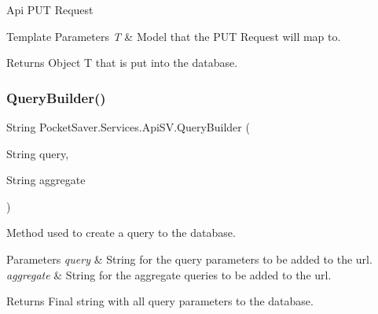 Api P\+UT Request 


\begin{DoxyTemplParams}{Template Parameters}
{\em T} & Model that the P\+UT Request will map to.\\
\hline
\end{DoxyTemplParams}
\begin{DoxyReturn}{Returns}
Object T that is put into the database.
\end{DoxyReturn}
\mbox{\label{class_pocket_saver_1_1_services_1_1_api_s_v_aa5064fcb4a18768820f20c39d75d4d44}} 
\subsubsection{\texorpdfstring{Query\+Builder()}{QueryBuilder()}}
{\footnotesize\ttfamily String Pocket\+Saver.\+Services.\+Api\+S\+V.\+Query\+Builder (\begin{DoxyParamCaption}\item[{String}]{query,  }\item[{String}]{aggregate }\end{DoxyParamCaption})\hspace{0.3cm}{\ttfamily [inline]}}



Method used to create a query to the database. 


\begin{DoxyParams}{Parameters}
{\em query} & String for the query parameters to be added to the url.\\
\hline
{\em aggregate} & String for the aggregate queries to be added to the url.\\
\hline
\end{DoxyParams}
\begin{DoxyReturn}{Returns}
Final string with all query parameters to the database.
\end{DoxyReturn}
\mbox{\label{class_pocket_saver_1_1_services_1_1_api_s_v_aa770136ecefc3ae66bff6dc75670df45}} 
